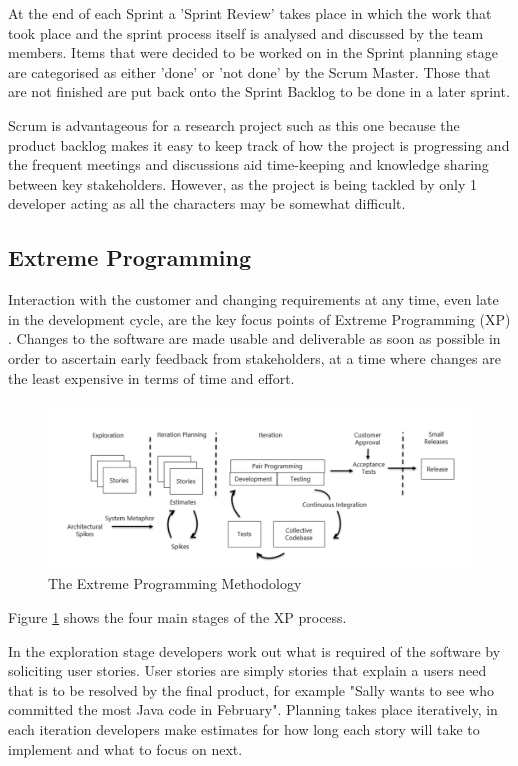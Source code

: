 \documentclass[11pt]{book}
\begin{document}
At the end of each Sprint a 'Sprint Review' takes place in which the work that took place and the sprint process itself is analysed and discussed by the team members. Items that were decided to be worked on in the Sprint planning stage are categorised as either 'done' or 'not done' by the Scrum Master. Those that are not finished are put back onto the Sprint Backlog to be done in a later sprint.

Scrum is advantageous for a research project such as this one because the product backlog makes it easy to keep track of how the project is progressing and the frequent meetings and discussions aid time-keeping and knowledge sharing between key stakeholders. However, as the project is being tackled by only 1 developer acting as all the characters may be somewhat difficult. 

\subsection{Extreme Programming}
Interaction with the customer and changing requirements at any time, even late in the development cycle, are the key focus points of Extreme Programming (XP) \cite{xpgentalintro}. Changes to the software are made usable and deliverable as soon as possible in order to ascertain early feedback from stakeholders, at a time where changes are the least expensive in terms of time and effort.

\begin{figure}[H]
	\centering
	\includegraphics[width=\textwidth]{images/xp}
	\caption{The Extreme Programming Methodology \cite{xpdiagram}}
	\label{fig:xp}
\end{figure}

Figure \ref{fig:xp} shows the four main stages of the XP process. 

In the exploration stage developers work out what is required of the software by soliciting user stories. User stories are simply stories that explain a users need that is to be resolved by the final product, for example "Sally wants to see who committed the most Java code in February". Planning takes place iteratively, in each iteration developers make estimates for how long each story will take to implement and what to focus on next.
\end{document}
